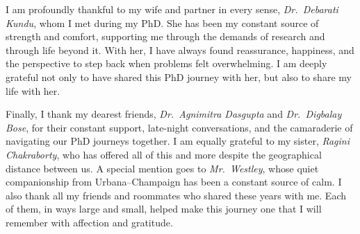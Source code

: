 I am profoundly thankful to my wife and partner in every sense, \textit{Dr.~Debarati Kundu}, whom I met during my PhD. She has been my constant source of strength and comfort, supporting me through the demands of research and through life beyond it. With her, I have always found reassurance, happiness, and the perspective to step back when problems felt overwhelming. I am deeply grateful not only to have shared this PhD journey with her, but also to share my life with her.

Finally, I thank my dearest friends, \textit{Dr.~Agnimitra Dasgupta} and \textit{Dr.~Digbalay Bose}, for their constant support, late-night conversations, and the camaraderie of navigating our PhD journeys together. I am equally grateful to my sister, \textit{Ragini Chakraborty}, who has offered all of this and more despite the geographical distance between us. A special mention goes to \textit{Mr.~Westley}, whose quiet companionship from Urbana--Champaign has been a constant source of calm. I also thank all my friends and roommates who shared these years with me. Each of them, in ways large and small, helped make this journey one that I will remember with affection and gratitude.

